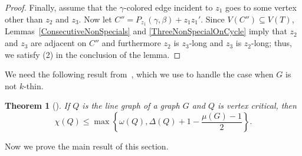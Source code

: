 \documentclass[12pt]{amsart}
\theoremstyle{plain}
\newtheorem{thm}{Theorem}
\theoremstyle{definition}
\theoremstyle{remark}
\begin{document}
\begin{proof}
Finally, assume that the $\gamma$-colored edge incident to $z_1$ goes to some
vertex other than $z_2$ and $z_3$.  Now let $C''=P_{z_1}(\gamma,\beta)+z_1z_1'$.
Since $V(C'')\subseteq V(T)$, Lemmas~\ref{ConsecutiveNonSpecials} and
\ref{ThreeNonSpecialOnCycle} imply that $z_2$ and $z_3$ are
adjacent on $C''$ and furthermore $z_2$ is $z_3$-long and $z_3$ is $z_2$-long;
thus, we satisfy (2) in the conclusion of the lemma.
\end{proof}

We need the following result from~\cite{rabern2011strengthening}, which we use
to handle the case when $G$ is not $k$-thin.

\begin{thm}[\cite{rabern2011strengthening}]\label{CriticalMuBound}
If $Q$ is the line graph of a graph $G$ and $Q$ is vertex critical, then
\[\chi(Q) \leq \max\left\{\omega(Q), \Delta(Q) + 1 - \frac{\mu(G) - 1}{2}\right\}.\]
\end{thm}

Now we prove the main result of this section.
\end{document}
